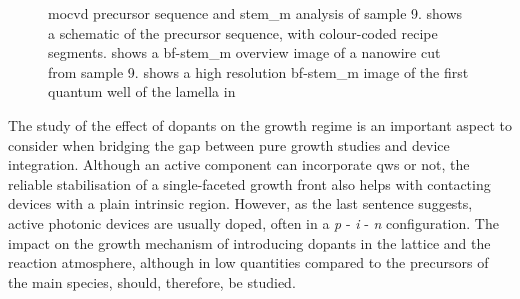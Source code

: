 \begin{figure}
{
    }
    \caption[\acs{mocvd} precursor sequence and \acs{stem_m} analysis of sample 9.]{\acs{mocvd} precursor sequence and \acs{stem_m} analysis of sample 9.  shows a schematic of the precursor sequence, with colour-coded recipe segments.  shows a \acs{bf}-\acs{stem_m} overview image of a nanowire cut from sample 9.  shows a high resolution \acs{bf}-\acs{stem_m} image of the first quantum well of the lamella in }
    \label{fig:s9_recipe_stem}
\end{figure}

The study of the effect of dopants on the  growth regime is an important aspect to consider when bridging the gap between pure growth studies and device integration. Although an active component can incorporate \acl{qw}s or not, the reliable stabilisation of a single-faceted growth front also helps with contacting devices with a plain intrinsic region. However, as the last sentence suggests, active photonic devices are usually doped, often in a \textit{p} - \textit{i} - \textit{n} configuration. The impact on the growth mechanism of introducing dopants in the lattice and the reaction atmosphere, although in low quantities compared to the precursors of the main species, should, therefore, be studied.

